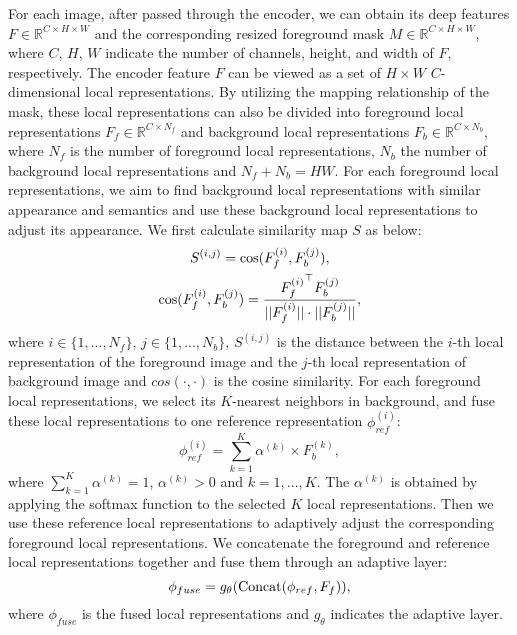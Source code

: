 \documentclass[sigconf]{acmart}
\begin{document}
For each image, after passed through the encoder, we can obtain its deep features $F\in \mathbb{R}^{C \times H \times W}$ and the corresponding resized foreground mask $M \in \mathbb{R}^{C \times H \times W}$, where $C$, $H$, $W$ indicate the number of channels, height, and width of $F$, respectively. The encoder feature $F$ can be viewed as a set of $H \times W$ $C$-dimensional local representations. By utilizing the mapping relationship of the mask, these local representations can also be divided into foreground local representations $F_f \in \mathbb{R}^{C \times N_f}$ and background local representations $F_b \in \mathbb{R}^{C \times N_b}$, where $N_f$ is the number of foreground local representations, $N_b$ the number of background local representations and $N_f + N_b = HW$. For each foreground local representations,  we aim to find background local representations with similar appearance and semantics and use these background local representations to adjust its appearance. We first calculate  similarity map $S$ as below:
\begin{gather}
	S^{(i,j)} =  {\rm cos}(F_f^{(i)},F_b^{(j)}),\\
	{\rm cos}(F_f^{(i)},F_b^{(j)}) = \frac{{F_f^{(i)}}^{\top} F_b^{(j)}}{||F_f^{(i)}||\cdot||F_b^{(j)}||},
\end{gather}
where $i \in \{1, ..., N_f\}$, $j \in \{1, ..., N_b\}$, $S^{(i,j)}$ is the distance
between the $i$-th local representation of the foreground image and the $j$-th local representation of background image and $cos(\cdot, \cdot)$ is the cosine similarity. For each foreground local representations, we select its $K$-nearest neighbors in background, and fuse these local representations to one reference representation $\phi_{ref}^{(i)}$:
\begin{equation}
	\phi_{ref}^{(i)} = \sum_{k=1}^{K} \alpha^{(k)} \times F_b^{(k)},
\end{equation}
where $\sum_{k=1}^{K} \alpha^{(k)} = 1$, $\alpha^{(k)} > 0$ and $k=1,...,K$. The $\alpha^{(k)}$ is obtained by applying the softmax function to the selected $K$ local representations. Then we use these reference local representations to adaptively adjust the corresponding foreground local representations. We concatenate the foreground and reference local representations together and fuse them through an adaptive layer:
\begin{equation}
	\phi_{fuse}= g_{\theta}({\rm Concat}(\phi_{ref}, F_f)),
\end{equation}
where $\phi_{fuse}$ is the fused local representations and $g_{\theta}$ indicates the adaptive layer.
\end{document}
